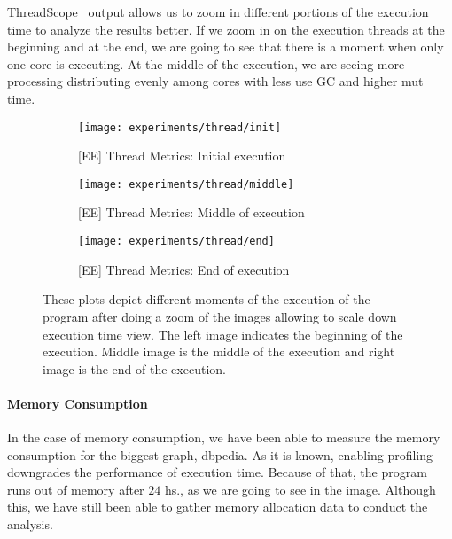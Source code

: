 ThreadScope~\cite{threadscope} output allows us to zoom in different portions of the execution time to analyze the results better. 
If we zoom in on the execution threads at the beginning and at the end, we are going to see that there is a moment when only one core is executing. 
At the middle of the execution, we are seeing more processing distributing evenly among cores with less use GC and higher \acrshort{mut} time.

\begin{figure}[!htb]
  \centering
  \begin{subfigure}[t]{0.3\textwidth}
   \texttt{[image: experiments/thread/init]}
   \caption{{[EE] Thread Metrics: Initial execution}}
   \label{fig:exp:perf:2}
  \end{subfigure}%
  \hspace{.3cm}%
  \begin{subfigure}[t]{0.3\textwidth}
    \texttt{[image: experiments/thread/middle]}
    \caption{{[EE] Thread Metrics: Middle of execution}}
    \label{fig:exp:perf:4}
   \end{subfigure}%
   \hspace{.3cm}%
   \begin{subfigure}[t]{0.3\textwidth}
   \texttt{[image: experiments/thread/end]}
   \caption{{[EE] Thread Metrics: End of execution}}
   \label{fig:exp:perf:3}
  \end{subfigure}%
  \caption[{[EE] Thread Metrics: Partitioned}]{These plots depict different moments of the execution of the program after doing a zoom of the images allowing to scale down execution time view. The left image indicates the beginning of the execution. Middle image is the middle of the execution and right image is the end of the execution.}
\end{figure}

\paragraph{Memory Consumption} In the case of memory consumption, we have been able to measure the memory consumption for the biggest graph, \acrshort{dbpedia}. 
As it is known, enabling profiling downgrades the performance of execution time. Because of that, the program runs out of memory after $24$ hs., as we are going to see in the image. Although this, we have still been able to gather memory allocation data to conduct the analysis.

